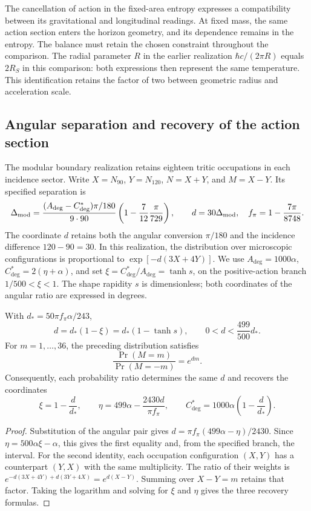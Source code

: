 The cancellation of action in the fixed-area entropy expresses a
compatibility between its gravitational and longitudinal readings.
At fixed mass, the same action section enters the horizon geometry,
and its dependence remains in the entropy. The balance must retain
the chosen constraint throughout the comparison.
The radial parameter \(R\) in the earlier realization
\(\hbar c/(2\pi R)\) equals \(2R_S\) in this comparison: both
expressions then represent the same temperature. This identification
retains the factor of two between geometric radius and acceleration scale.

\subsection{Angular separation and recovery of the action section}

The modular boundary realization retains eighteen tritic occupations
in each incidence sector. Write \(X=N_{90}\), \(Y=N_{120}\),
\(N=X+Y\), and \(M=X-Y\). Its specified separation is
\[
 \Delta_{\rm mod}=
 \frac{(A_{\deg}-C^*_{\deg})\pi/180}{9\cdot90}
 \left(1-\frac7{12}\frac\pi{729}\right),\qquad
 d=30\Delta_{\rm mod},\quad f_\pi=1-\frac{7\pi}{8748}.
\]
The coordinate \(d\) retains both the angular conversion \(\pi/180\)
and the incidence difference \(120-90=30\). In this realization, the
distribution over microscopic configurations is proportional to
\(\exp[-d(3X+4Y)]\).
We use \(A_{\deg}=1000\alpha\),
\(C^*_{\deg}=2(\eta+\alpha)\), and set
\(\xi=C^*_{\deg}/A_{\deg}=\tanh s\), on the positive-action branch
\(1/500<\xi<1\). The shape rapidity \(s\) is dimensionless; both
coordinates of the angular ratio are expressed in degrees.

\begin{proposition}
\label{ins29:vii:curva}
With \(d_*=50\pi f_\pi\alpha/243\),
\[
 d=d_*(1-\xi)=d_*(1-\tanh s),\qquad
 0<d<\frac{499}{500}d_*.
\]
For \(m=1,\ldots,36\), the preceding distribution satisfies
\[
 \frac{\Pr(M=m)}{\Pr(M=-m)}=e^{dm}.
\]
Consequently, each probability ratio determines the same \(d\) and
recovers the coordinates
\[
 \xi=1-\frac d{d_*},\qquad
 \eta=499\alpha-\frac{2430d}{\pi f_\pi},\qquad
 C^*_{\deg}=1000\alpha\left(1-\frac d{d_*}\right).
\]
\end{proposition}
\begin{proof}
Substitution of the angular pair gives
\(d=\pi f_\pi(499\alpha-\eta)/2430\).
Since \(\eta=500\alpha\xi-\alpha\), this gives the first equality
and, from the specified branch, the interval. For the second identity,
each occupation configuration \((X,Y)\) has a counterpart \((Y,X)\)
with the same multiplicity. The ratio of their weights is
\(e^{-d(3X+4Y)+d(3Y+4X)}=e^{d(X-Y)}\).
Summing over \(X-Y=m\) retains that factor. Taking the logarithm and
solving for \(\xi\) and \(\eta\) gives the three recovery formulas.
\end{proof}


